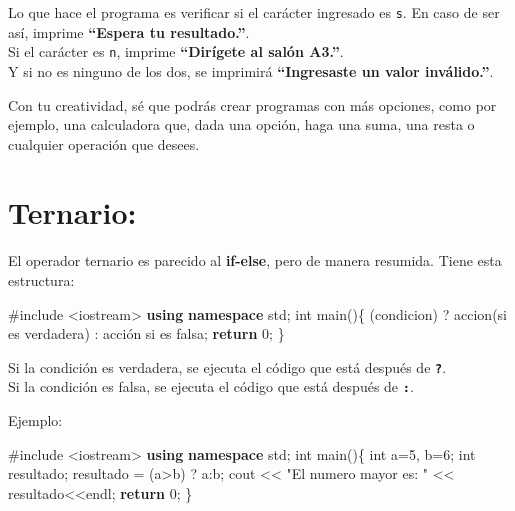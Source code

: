 \documentclass[
  11pt,
  a4paper,
  DIV=11,
  numbers=noendperiod]{scrreprt}
\newenvironment{Shaded}{\begin{snugshade}}{\end{snugshade}}
\newcommand{\ControlFlowTok}[1]{\textcolor[rgb]{0.00,0.23,0.31}{\textbf{#1}}}
\newcommand{\DataTypeTok}[1]{\textcolor[rgb]{0.68,0.00,0.00}{#1}}
\newcommand{\DecValTok}[1]{\textcolor[rgb]{0.68,0.00,0.00}{#1}}
\newcommand{\ImportTok}[1]{\textcolor[rgb]{0.00,0.46,0.62}{#1}}
\newcommand{\KeywordTok}[1]{\textcolor[rgb]{0.00,0.23,0.31}{\textbf{#1}}}
\newcommand{\NormalTok}[1]{\textcolor[rgb]{0.00,0.23,0.31}{#1}}
\newcommand{\OperatorTok}[1]{\textcolor[rgb]{0.37,0.37,0.37}{#1}}
\newcommand{\PreprocessorTok}[1]{\textcolor[rgb]{0.68,0.00,0.00}{#1}}
\newcommand{\StringTok}[1]{\textcolor[rgb]{0.13,0.47,0.30}{#1}}
\begin{document}
Lo que hace el programa es verificar si el carácter ingresado es
\texttt{\textquotesingle{}s\textquotesingle{}}. En caso de ser así,
imprime \textbf{``Espera tu resultado.''}.\\
Si el carácter es \texttt{\textquotesingle{}n\textquotesingle{}},
imprime \textbf{``Dirígete al salón A3.''}.\\
Y si no es ninguno de los dos, se imprimirá \textbf{``Ingresaste un
valor inválido.''}.

Con tu creatividad, sé que podrás crear programas con más opciones, como
por ejemplo, una calculadora que, dada una opción, haga una suma, una
resta o cualquier operación que desees.

\section{Ternario:}\label{ternario}

El operador ternario es parecido al \textbf{if-else}, pero de manera
resumida. Tiene esta estructura:

\begin{Shaded}
\begin{Highlighting}[]
\PreprocessorTok{\#include }\ImportTok{\textless{}iostream\textgreater{}}
\KeywordTok{using} \KeywordTok{namespace}\NormalTok{ std}\OperatorTok{;}
\DataTypeTok{int}\NormalTok{ main}\OperatorTok{()\{}
    \OperatorTok{(}\NormalTok{condicion}\OperatorTok{)} \OperatorTok{?}\NormalTok{ accion}\OperatorTok{(}\NormalTok{si es verdadera}\OperatorTok{)} \OperatorTok{:}\NormalTok{ acción si es falsa}\OperatorTok{;}
    \ControlFlowTok{return} \DecValTok{0}\OperatorTok{;}
\OperatorTok{\}}
\end{Highlighting}
\end{Shaded}

Si la condición es verdadera, se ejecuta el código que está después de
\textbf{\texttt{?}}.\\
Si la condición es falsa, se ejecuta el código que está después de
\textbf{\texttt{:}}.

Ejemplo:

\begin{Shaded}
\begin{Highlighting}[]
\PreprocessorTok{\#include }\ImportTok{\textless{}iostream\textgreater{}}
\KeywordTok{using} \KeywordTok{namespace}\NormalTok{ std}\OperatorTok{;}
\DataTypeTok{int}\NormalTok{ main}\OperatorTok{()\{}
    \DataTypeTok{int}\NormalTok{ a}\OperatorTok{=}\DecValTok{5}\OperatorTok{,}\NormalTok{ b}\OperatorTok{=}\DecValTok{6}\OperatorTok{;}
    \DataTypeTok{int}\NormalTok{ resultado}\OperatorTok{;} 
\NormalTok{    resultado }\OperatorTok{=} \OperatorTok{(}\NormalTok{a}\OperatorTok{\textgreater{}}\NormalTok{b}\OperatorTok{)} \OperatorTok{?}\NormalTok{ a}\OperatorTok{:}\NormalTok{b}\OperatorTok{;}
\NormalTok{    cout }\OperatorTok{\textless{}\textless{}} \StringTok{"El numero mayor es: "} \OperatorTok{\textless{}\textless{}}\NormalTok{ resultado}\OperatorTok{\textless{}\textless{}}\NormalTok{endl}\OperatorTok{;}
    \ControlFlowTok{return} \DecValTok{0}\OperatorTok{;}
\OperatorTok{\}}
\end{Highlighting}
\end{Shaded}
\end{document}
